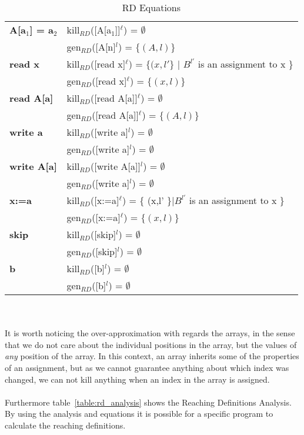 \begin{table}[h]
    \begin{tabular}{l | l }
    \textbf{A[a$_1$] = a$_2$} & kill$_{RD}$([A[a$_1$]]$^\ell$) = $\emptyset$ \\
                              & gen$_{RD}$([A[n]$^l$) = $\{(A,l)\}$ \\

    \hline
    \textbf{read x} & kill$_{RD}$([read x]$^\ell$) = $\{(x,l' \}$ | $B^{l'}$ is an assignment to x \} \\
                              & gen$_{RD}$([read x]$^\ell$) = $\{(x,l)\}$ \\
							  
    \hline
    \textbf{read A[a]} & kill$_{RD}$([read A[a]]$^\ell$) = $\emptyset$ \\
                              & gen$_{RD}$([read A[a]]$^\ell$) = $\{(A,l)\}$ \\
							  
    \hline
    \textbf{write a} &  kill$_{RD}$([write a]$^l$) = $\emptyset$ \\
                   &  gen$_{RD}$([write a]$^l$) = $\emptyset$ \\

    \hline
    \textbf{write A[a]} &  kill$_{RD}$([write A[a]]$^l$) = $\emptyset$ \\
                   &  gen$_{RD}$([write a]$^l$) = $\emptyset$ \\

    \hline
    \textbf{x:=a} & kill$_{RD}$([x:=a]$^\ell$) = \{ (x,l' \}|$B^{l'}$ is an assignment to x \} \\
                              & gen$_{RD}$([x:=a]$^\ell$) = $\{(x,l)\}$ \\
	\hline
	\textbf{skip} & kill$_{RD}$([skip]$^l$) = $\emptyset$ \\
				&  gen$_{RD}$([skip]$^l$) = $\emptyset$ \\
	\hline
	\textbf{b} & kill$_{RD}$([b]$^l$) = $\emptyset$ \\
				&  gen$_{RD}$([b]$^l$) = $\emptyset$ \\
    \end{tabular}
    \centering
	\caption{RD Equations}
	\label{table:rd_equations}
\end{table}
\\\\
It is worth noticing the over-approximation with regards the arrays, in the sense that we do not care about the individual positions in the array, but the values of \emph{any} position of the array. In this context, an array inherits some of the properties of an assignment, but as we cannot guarantee anything about which index was changed, we can not kill anything when an index in the array is assigned.
\\\\
Furthermore table~\ref{table:rd_analysis} shows the Reaching Definitions Analysis. By using the analysis and equations it is possible for a specific program to calculate the reaching definitions.

